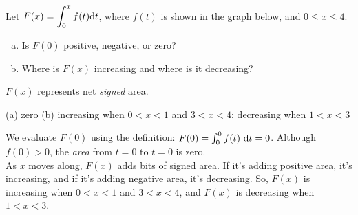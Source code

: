 \begin{Mquestion}\label{1.1_intpic1}
Let $F(x) = \displaystyle\int_0^x f(t)\mathrm{d}t$, where $f(t)$ is shown in the graph below, and $0 \leq x \leq 4$.
\begin{enumerate}[(a)]
\item Is $F(0)$ positive, negative, or zero?
\item Where is $F(x)$ increasing and where is it decreasing?
\end{enumerate}
\begin{center}
\end{center}
\end{Mquestion}
\begin{hint}
$F(x)$ represents net \emph{signed} area.
\end{hint}
\begin{answer}
(a) zero \qquad (b) increasing when $0 < x < 1$ and $3<x<4$; decreasing when $1<x<3$
\end{answer}
\begin{solution}
We evaluate $F(0)$ using the definition: $F(0) = \int_0^0 f(t)\ \dee{t}=0$. Although $f(0)>0$, the \emph{area} from $t=0$ to $t=0$ is zero.\\
As $x$ moves along, $F(x)$ adds bits of signed area. If it's adding positive area, it's increasing, and if it's adding negative area, it's decreasing. So, $F(x)$ is increasing when $0 < x < 1$ and $3<x<4$, and $F(x)$ is decreasing when $1<x<3$.
\end{solution}

